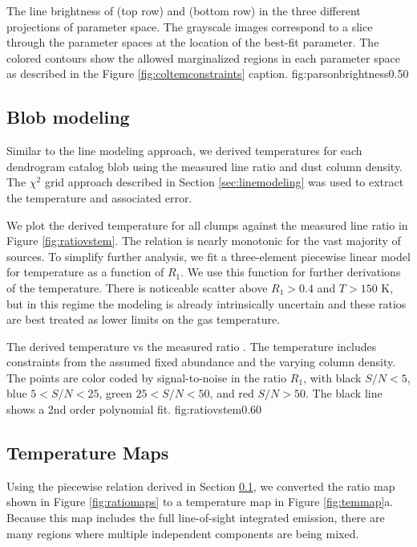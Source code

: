 {The line brightness of \para \threeohthree (top row) and \para \threetwoone
(bottom row) in the three different projections of parameter space.  The
grayscale images correspond to a slice through the parameter spaces at the
location of the best-fit parameter.  The colored contours show the allowed
marginalized regions in each parameter space as described in the
Figure \ref{fig:coltemconstraints} caption.}
{fig:parsonbrightness}{0.5}{0}

\subsection{Blob modeling}
\label{sec:dendromod}
Similar to the line modeling approach, we derived temperatures for each
dendrogram catalog blob using the measured line ratio and dust column density.
The $\chi^2$ grid approach described in Section \ref{sec:linemodeling} was used
to extract the temperature and associated error.

We plot the derived temperature for all clumps against the measured line ratio
in Figure \ref{fig:ratiovstem}.  The relation is nearly monotonic for the vast
majority of sources.  To simplify further analysis, we fit a three-element
piecewise linear model for temperature as a function of $R_1$.  We use this
function for further derivations of the temperature.  There is noticeable
scatter above $R_1 > 0.4$ and $T>150$ K, but in this regime the modeling is
already intrinsically uncertain and these ratios are best treated as lower
limits on the gas temperature.

{The derived temperature vs the measured ratio \Rone.  The temperature
includes constraints from the assumed fixed \formaldehyde abundance and the 
varying column density.  The points are color coded by signal-to-noise in the
ratio $R_1$, with black $S/N < 5$, blue $5 < S/N < 25$, green $25 < S/N < 50$,
and red $S/N > 50$.  The black line shows a 2nd order polynomial fit.
}
{fig:ratiovstem}{0.6}{0}

\subsection{Temperature Maps}
\label{sec:formaldehydetemmap}
Using the piecewise relation derived in Section \ref{sec:dendromod}, we
converted the ratio map shown in Figure \ref{fig:ratiomaps} to a temperature
map in Figure \ref{fig:temmap}a.  Because this map includes the full line-of-sight
integrated emission, there are many regions where multiple independent components
are being mixed.

